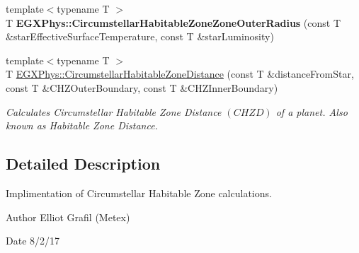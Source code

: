 \begin{DoxyCompactItemize}
\item 
\mbox{\label{namespace_e_g_x_phys_ac6f89712c52ce26e1e2085fd85a914ea}} 
{\footnotesize template$<$typename T $>$ }\\T {\bfseries E\+G\+X\+Phys\+::\+Circumstellar\+Habitable\+Zone\+Zone\+Outer\+Radius} (const T \&star\+Effective\+Surface\+Temperature, const T \&star\+Luminosity)
\item 
{\footnotesize template$<$typename T $>$ }\\T \mbox{\hyperlink{group___astrophysics_gacf3a720793cdb27f6d93b170b44e81be}{E\+G\+X\+Phys\+::\+Circumstellar\+Habitable\+Zone\+Distance}} (const T \&distance\+From\+Star, const T \&C\+H\+Z\+Outer\+Boundary, const T \&C\+H\+Z\+Inner\+Boundary)
\begin{DoxyCompactList}\small\item\em Calculates Circumstellar Habitable Zone Distance $(CHZD)$ of a planet. Also known as Habitable Zone Distance. \end{DoxyCompactList}\end{DoxyCompactItemize}


\subsection{Detailed Description}
Implimentation of Circumstellar Habitable Zone calculations. 

\begin{DoxyAuthor}{Author}
Elliot Grafil (Metex) 
\end{DoxyAuthor}
\begin{DoxyDate}{Date}
8/2/17 
\end{DoxyDate}
